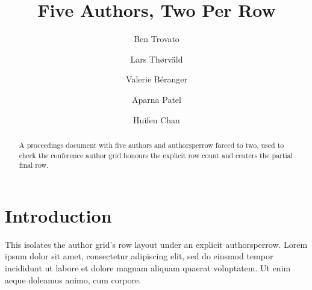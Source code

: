 \documentclass[sigconf]{acmart}
\begin{document}
\title{Five Authors, Two Per Row}

\author{Ben Trovato}

\author{Lars Th{\o}rv{\"a}ld}

\author{Valerie B\'eranger}

\author{Aparna Patel}

\author{Huifen Chan}

\begin{abstract}
  A proceedings document with five authors and authorsperrow forced to two, used
  to check the conference author grid honours the explicit row count and centers
  the partial final row.
\end{abstract}

\maketitle

\section{Introduction}
This isolates the author grid's row layout under an explicit authorsperrow.
Lorem ipsum dolor sit amet, consectetur adipiscing elit, sed do eiusmod tempor
incididunt ut labore et dolore magnam aliquam quaerat voluptatem. Ut enim aeque
doleamus animo, cum corpore.
\end{document}
